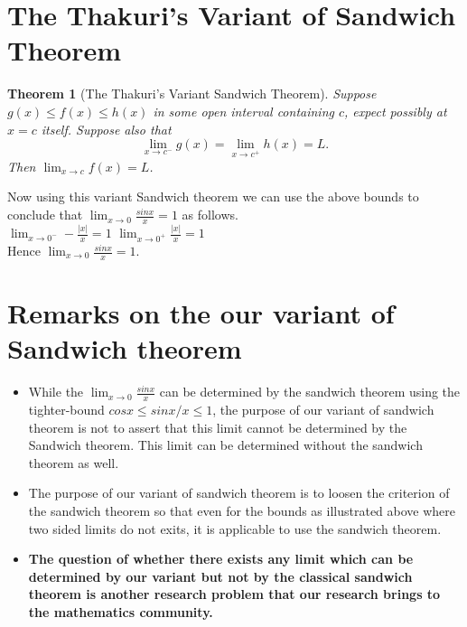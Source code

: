 \documentclass[a4paper,twoside,12pt]{article}
\theoremstyle{plain}
\newtheorem{theorem}{Theorem}[section]
\theoremstyle{definition}
\begin{document}
\section{The Thakuri's Variant of Sandwich Theorem}
\begin{theorem}[The Thakuri's Variant Sandwich Theorem]
Suppose $g(x) \leq f(x) \leq h(x)$ in some open interval containing $c$, expect possibly at $x=c$ itself. Suppose also that $$\lim_{x \to c^-} g(x) = \lim_{x \to c^+} h(x) =L  .$$ Then $\displaystyle \lim_{x \to c} f(x)=L$.
\end{theorem}

Now using this variant Sandwich theorem we can use the above bounds to conclude that \(\displaystyle \lim_{x \to 0} \frac{sinx}{x}=1\) as follows. \\[2mm]
 \(\displaystyle \lim_{x \to 0^-} -\frac{|x|}{x}=1\) \hspace{7cm}
 \(\displaystyle \lim_{x \to 0^+} \frac{|x|}{x}=1\) \\[3mm]

 Hence \(\displaystyle \lim_{x \to 0} \frac{sinx}{x}=1\).

 \section{Remarks on the our variant of Sandwich theorem}
 \begin{itemize}
 \item  While the \(\displaystyle \lim_{x \to 0} \frac{sinx}{x}\) can be determined by the sandwich theorem using the tighter-bound $cosx \leq sinx/x \leq 1$, the purpose of our variant of sandwich theorem is not to assert that this limit cannot be determined by the Sandwich theorem. This limit can be determined without the sandwich theorem as well.

 \item The purpose of our variant of sandwich theorem is to loosen the criterion of the sandwich theorem so that even for the bounds as illustrated above where two sided limits do not exits, it is applicable to use the sandwich theorem.

\item \textbf{The question of whether there exists any limit which can be determined by our variant but not by the classical sandwich theorem is another research problem that our research brings to the mathematics community.}
 \end{itemize}

\vspace{5mm}
\end{document}
